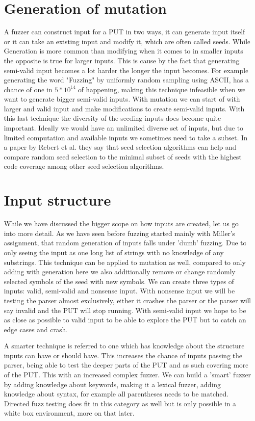 \section{Generation of mutation}
A fuzzer can construct input for a PUT in two ways, it can generate input itself or it can take an existing input and modify it, which are often called seeds. While Generation is more common than modifying when it comes to in smaller inputs the opposite is true for larger inputs. This is cause by the fact that generating semi-valid input becomes a lot harder the longer the input becomes. For example generating the word "Fuzzing" by uniformly random sampling using ASCII, has a chance of one in $5*10^{14}$ of happening, making this technique infeasible when we want to generate bigger semi-valid inputs. With mutation we can start of with larger and valid input and make modifications to create semi-valid inputs. With this last technique the diversity of the seeding inputs does become quite important. Ideally we would have an unlimited diverse set of inputs, but due to limited computation and available inputs we sometimes need to take a subset. In a paper by Rebert et al. \cite{14rebert2014seedselecting} they say that seed selection algorithms can help and compare random seed selection to the minimal subset of seeds with the highest code coverage among other seed selection algorithms. 

\section{Input structure}
While we have discussed the bigger scope on how inputs are created, let us go into more detail. As we have seen before fuzzing started mainly with Miller's assignment, that random generation of inputs falls under 'dumb' fuzzing. Due to only seeing the input as one long list of strings with no knowledge of any substrings. This technique can be applied to mutation as well, compared to only adding with generation here we also additionally remove or change randomly selected symbols of the seed with new symbols. 
We can create three types of inputs: valid, semi-valid and nonsense input. With nonsense input we will be testing the parser almost exclusively, either it crashes the parser or the parser will say invalid and the PUT will stop running. With semi-valid input we hope to be as close as possible to valid input to be able to explore the PUT but to catch an edge cases and crash.

A smarter technique is referred to one which has knowledge about the structure inputs can have or should have. This increases the chance of inputs passing the parser, being able to test the deeper parts of the PUT and as such covering more of the PUT. This with an increased complex fuzzer. We can build a 'smart' fuzzer by adding knowledge about keywords, making it a lexical fuzzer, adding knowledge about syntax, for example all parentheses needs to be matched. Directed fuzz testing does fit in this category as well but is only possible in a white box environment, more on that later.

